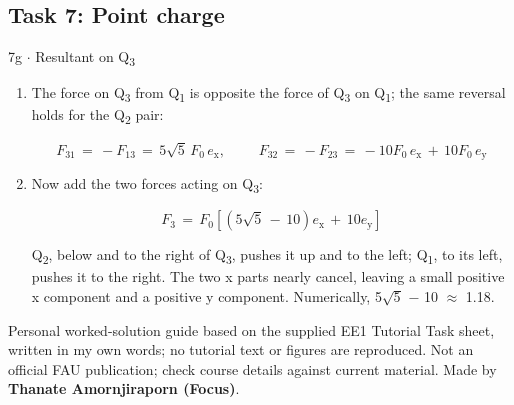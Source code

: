 \documentclass[11pt]{article}
\begin{document}
\begin{keepsection}\subsection{Task 7: Point charge}

\begin{workedbox}{7g \ensuremath{\cdot} Resultant on Q\textsubscript{3}}
\begin{enumerate}
\item {}
The force on Q\textsubscript{3} from Q\textsubscript{1} is opposite the force of Q\textsubscript{3} on Q\textsubscript{1}; the same reversal holds for the Q\textsubscript{2} pair:

\begin{equation*}{F}_{31}\, =\, -{F}_{13}\, =\, 5\sqrt{5}\, {F}_{0}\, {e}_{\mathrm{x}},\quad \, \quad \, {F}_{32}\, =\, -{F}_{23}\, =\, -10{F}_{0}\, {e}_{\mathrm{x}}\, +\, 10{F}_{0}\, {e}_{\mathrm{y}}\end{equation*}
\item {}
Now add the two forces acting on Q\textsubscript{3}:

\begin{equation*}{F}_{3}\, =\, {F}_{0}[(5\sqrt{5}\, -\, 10){e}_{\mathrm{x}}\, +\, 10{e}_{\mathrm{y}}]\end{equation*}

Q\textsubscript{2}, below and to the right of Q\textsubscript{3}, pushes it up and to the left; Q\textsubscript{1}, to its left, pushes it to the right. The two x parts nearly cancel, leaving a small positive x component and a positive y component. Numerically, 5\ensuremath{\sqrt{5}} \ensuremath{-} 10 \ensuremath{\approx} 1.18.
\end{enumerate}
\end{workedbox}

\end{keepsection}

\vfill{\small Personal worked-solution guide based on the supplied EE1 Tutorial Task sheet, written in my own words; no tutorial text or figures are reproduced. Not an official FAU publication; check course details against current material. Made by \textbf{Thanate Amornjiraporn (Focus)}.}
\end{document}
